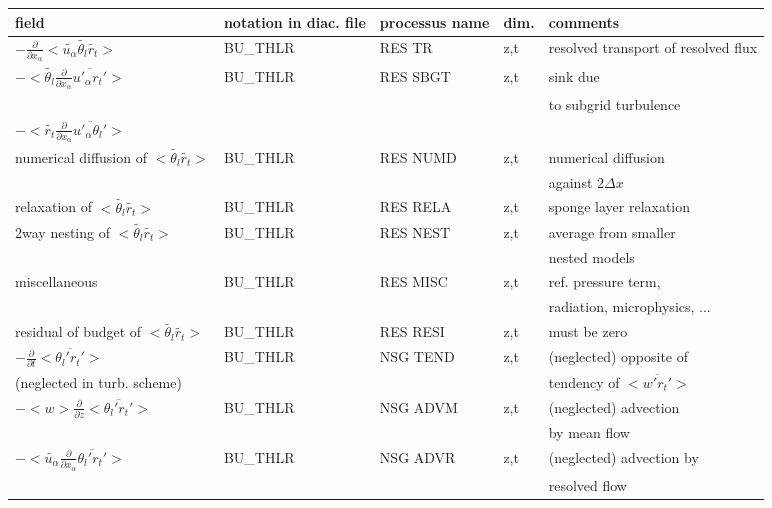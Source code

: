 \begin{center}
\begin{tabular}{||p{5cm}|>{\centering}p{2cm}|>{\centering}p{2.5cm}|>{\centering}p{0.5cm}|p{5.5cm }||}
\hline
\hline
field & notation in diac. file & processus name& dim.  & comments \\
\hline
\hline

$-\frac{\partial}{\partial x_\alpha} <\tilde{u_\alpha} \tilde{\theta_l}\tilde{r_t}>$ & BU\_THLR & RES TR   & z,t & resolved transport of resolved flux \\
\hline
$- <\tilde{\theta_l}\frac{\partial}{\partial x_\alpha}\overline{u'_\alpha r_t'}>$
& BU\_THLR & RES SBGT & z,t & sink due \\
 & & & &to subgrid turbulence \\
$- <\tilde{r_t}\frac{\partial}{\partial x_\alpha}\overline{u'_\alpha \theta_l'}>$
&&&&\\
\hline
{\rm numerical diffusion of } $<\tilde{\theta_l}\tilde{r_t}>$& BU\_THLR & RES NUMD & z,t & numerical diffusion\\
 & & & &against $2\Delta x$ \\
\hline
{\rm relaxation of }$<\tilde{\theta_l}\tilde{r_t}>$ & BU\_THLR & RES RELA & z,t& sponge layer relaxation \\
\hline
{\rm 2way nesting of }$<\tilde{\theta_l}\tilde{r_t}>$ & BU\_THLR & RES NEST & z,t& average from smaller\\
 & & & &nested models \\
\hline
{\rm miscellaneous} & BU\_THLR & RES MISC & z,t & ref. pressure term, \\
 & & && radiation, microphysics, ... \\
\hline
{\rm residual of budget of} $<\tilde{\theta_l}\tilde{r_t}>$ & BU\_THLR & RES RESI & z,t & must be zero \\
\hline
$-\frac{\partial }{\partial t}<\overline{\theta_l'r_t'}>$ & BU\_THLR & NSG TEND & z,t & (neglected) opposite of\\
(neglected in turb. scheme) & & & &tendency of $<\overline{w'r_t'}>$ \\
\hline
$-<w>\frac{\partial}{\partial z}<\overline{\theta_l'r_t'}>$  & BU\_THLR & NSG ADVM & z,t & (neglected) advection \\
 & & & & by mean flow\\
\hline
$-<\tilde{u_\alpha}\frac{\partial}{\partial x_\alpha}\overline{\theta_l'r_t'}>$  & BU\_THLR & NSG ADVR & z,t & (neglected) advection by\\
 & & & &resolved flow\\
\hline
\hline
\end{tabular}
\end{center}


